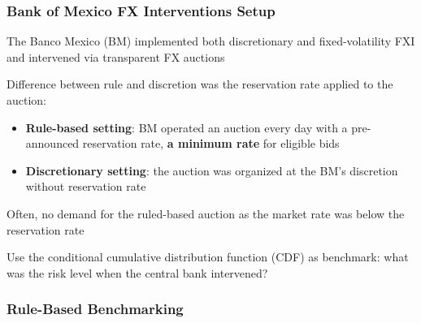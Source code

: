 \documentclass{beamer}
\newenvironment{largeitemize}{\itemize\addtolength{\itemsep}{10pt}}{\enditemize}
\begin{document}
\begin{frame}
  \frametitle{Bank of Mexico FX Interventions Setup}  
  \begin{largeitemize}
    \item The Banco Mexico (BM) implemented both discretionary and
      fixed-volatility FXI and intervened via transparent FX auctions
    \item Difference between rule and discretion was the reservation rate applied to the auction:
      \begin{itemize}
      \item \textbf{Rule-based setting}: BM operated an auction every day
        with a pre-announced reservation rate, \textbf{a minimum rate} for
        eligible bids
      \item \textbf{Discretionary setting}: the auction was organized at the BM's discretion without reservation rate
      \end{itemize}
  \item Often, no demand for the ruled-based auction as the market rate was below the reservation rate
  \item Use the conditional cumulative distribution function (CDF) as
    benchmark: what was the risk level when the central bank intervened?
  \end{largeitemize}
\end{frame}


\begin{frame}
  \frametitle{Rule-Based Benchmarking}
\end{frame}
\end{document}
